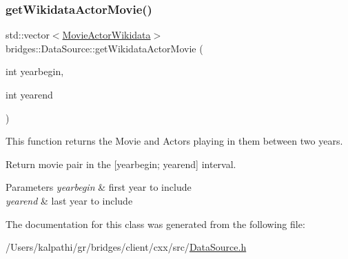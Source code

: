 \subsubsection{\texorpdfstring{get\+Wikidata\+Actor\+Movie()}{getWikidataActorMovie()}}
{\footnotesize\ttfamily std\+::vector$<$\mbox{\hyperlink{classbridges_1_1dataset_1_1_movie_actor_wikidata}{Movie\+Actor\+Wikidata}}$>$ bridges\+::\+Data\+Source\+::get\+Wikidata\+Actor\+Movie (\begin{DoxyParamCaption}\item[{int}]{yearbegin,  }\item[{int}]{yearend }\end{DoxyParamCaption})\hspace{0.3cm}{\ttfamily [inline]}}



This function returns the Movie and Actors playing in them between two years. 

Return movie pair in the \mbox{[}yearbegin; yearend\mbox{]} interval.


\begin{DoxyParams}{Parameters}
{\em yearbegin} & first year to include \\
\hline
{\em yearend} & last year to include \\
\hline
\end{DoxyParams}


The documentation for this class was generated from the following file\+:\begin{DoxyCompactItemize}
\item 
/\+Users/kalpathi/gr/bridges/client/cxx/src/\mbox{\hyperlink{_data_source_8h}{Data\+Source.\+h}}\end{DoxyCompactItemize}
